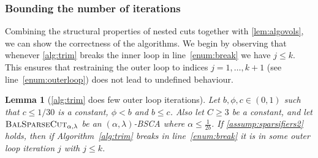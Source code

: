 \documentclass[epsfig,letter,11pt]{article}
\numberwithin{equation}{section}
\newcommand{\bsc}{\textsc{BalSparseCut}_{\alpha,\lambda}}
\newtheorem{lemma}[theorem]{Lemma}
\begin{document}
\subsubsection{Bounding the number of iterations}
\label{subsubsec:iter}

\noindent
Combining the structural properties of nested cuts together with \cref{lem:algovols}, we can show the correctness of the algorithms. We begin by observing that whenever \cref{alg:trim} breaks the inner loop in line~\eqref{enum:break} we have $j \le k$. This ensures that restraining the outer loop to indices $j=1,\dots, k+1$ (see line~\eqref{enum:outerloop}) does not lead to undefined behaviour.

\begin{lemma}[\cref{alg:trim} does few outer loop iterations]
	\label{lem:boundouterloop}
	Let $b, \phi,c \in (0,1)$ such that $c \leq 1/30$ is a constant, $\phi < b$ and $b \le c$. Also let $C \ge 3$ be a constant, and let $\bsc$ be an $(\alpha,\lambda)$-BSCA where $\alpha \le \frac{1}{2b}$. If \cref{assump:sparsifiers2} holds, then if Algorithm~\ref{alg:trim} breaks in line~\eqref{enum:break} it is in some outer loop iteration $j$ with $j \le k$.
\end{lemma}
\end{document}
